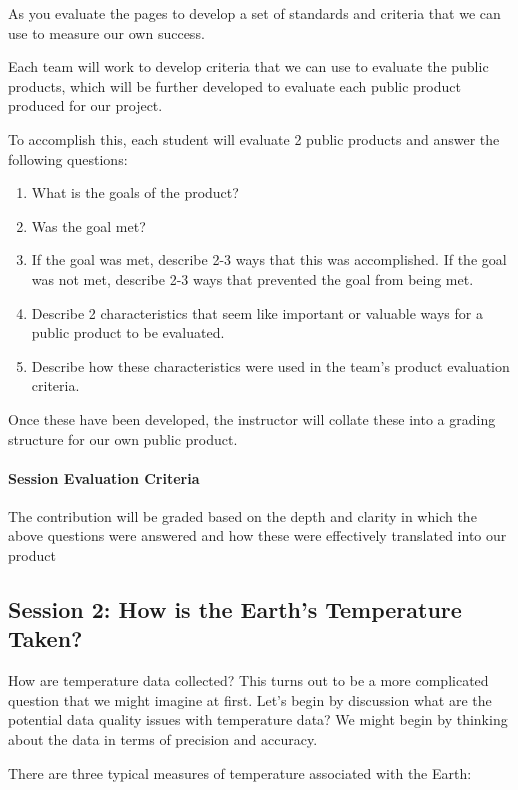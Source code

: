 \documentclass{article}\usepackage[]{graphicx}\usepackage[]{color}
\begin{document}
As you evaluate the pages to develop a set of standards and criteria that we can use to measure our own success.

Each team will work to develop criteria that we can use to evaluate the public products, which will be further developed to evaluate each public product produced for our project.

To accomplish this, each student will evaluate 2 public products and answer the following questions:

\begin{enumerate}
  \item What is the goals of the product?
  \item Was the goal met?
  \item If the goal was met, describe 2-3 ways that this was accomplished. If the goal was not met, describe 2-3 ways that prevented the goal from being met.
  \item Describe 2 characteristics that seem like important or valuable ways for a public product to be evaluated.
  \item Describe how these characteristics were used in the team's product evaluation criteria. 
\end{enumerate}

Once these have been developed, the instructor will collate these into a grading structure for our own public product. 

\paragraph{Session Evaluation Criteria}

The contribution will be graded based on the depth and clarity in which the above questions were answered and how these were effectively translated into our product   

\subsection{Session 2: How is the Earth's Temperature Taken?}

How are temperature data collected? This turns out to be a more complicated question that we might imagine at first. Let's begin by discussion what are the potential data quality issues with temperature data? We might begin by thinking about the data in terms of precision and accuracy.

There are three typical measures of temperature associated with the Earth: 
\end{document}
